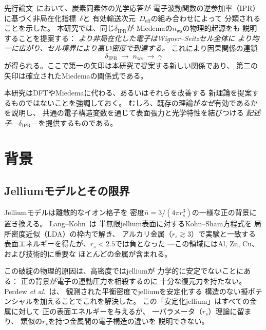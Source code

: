 \documentclass[twocolumn,showpacs,preprintnumbers,amsmath,amssymb,prb]{revtex4-2}
\begin{document}
先行論文~\cite{SentoOpticsPaper1}において、炭素同素体の光学応答が
電子波動関数の逆参加率（IPR）に基づく非局在化指標~$\delta$と
有効輸送次元~$D_\mathrm{eff}$の組み合わせによって
分類されることを示した。
本研究では、同じ$\delta_\mathrm{IPR}$が
Miedemaの$n_\mathrm{ws}$の物理的起源をも
説明することを提案する：
\emph{より非局在化した電子はWigner--Seitzセル全体に
より均一に広がり、セル境界により高い密度で到達する。}
これにより因果関係の連鎖
\begin{equation}
  \delta_\mathrm{IPR} \;\to\; n_\mathrm{ws} \;\to\; \gamma
  \label{eq:causal}
\end{equation}
が得られる。ここで第一の矢印は本研究で提案する新しい関係であり、
第二の矢印は確立されたMiedemaの関係式である。

本研究はDFTやMiedemaに代わる、あるいはそれらを改善する
新理論を提案するものではないことを強調しておく。
むしろ、既存の理論が\emph{なぜ}有効であるかを説明し、
共通の電子構造変数を通じて表面張力と光学特性を結びつける
\emph{記述子}---$\delta_\mathrm{IPR}$---を提供するものである。


\section{背景}
\label{sec:background}

\subsection{Jelliumモデルとその限界}

Jelliumモデルは離散的なイオン格子を
密度$\bar{n} = 3/(4\pi r_s^3)$の一様な正の背景に置き換える。
Lang--Kohn~\cite{LangKohn1970,LangKohn1971}は
半無限jellium表面に対するKohn--Sham方程式を
局所密度近似（LDA）の枠内で解き、
アルカリ金属（$r_s \gtrsim 3$）で実験と一致する
表面エネルギーを得たが、$r_s < 2.5$では負となった
---この領域にはAl, Zn, Cu、および技術的に重要な
ほとんどの金属が含まれる。

この破綻の物理的原因は、高密度ではjelliumが
力学的に安定でないことにある：
正の背景が電子の運動圧力を相殺するのに
十分な復元力を持たない。
Perdew \textit{et al.}~\cite{Perdew1990}は、
観測された平衡密度でjelliumを安定化する
構造のない擬ポテンシャルを加えることでこれを解決した。
この「安定化jellium」はすべての金属に対して
正の表面エネルギーを与えるが、
一パラメータ（$r_s$）理論に留まり、
類似の$r_s$を持つ金属間の電子構造の違いを
説明できない。
\end{document}
